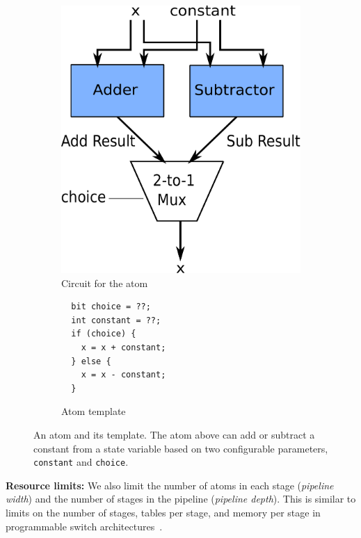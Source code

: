 \begin{figure}[h]
  \begin{subfigure}{0.4\columnwidth}
  \includegraphics[width=\textwidth]{circuit.pdf}
  \caption{Circuit for the atom}
  \label{fig:alu_diag}
  \end{subfigure}
  \hspace{0.05\columnwidth}
  \begin{subfigure}{0.55\columnwidth}
  \begin{lstlisting}
  bit choice = ??;
  int constant = ??;
  if (choice) {
    x = x + constant;
  } else {
    x = x - constant;
  }
  \end{lstlisting}
  \caption{Atom template}
  \label{fig:alu_in_sketch}
  \end{subfigure}
  \caption{An atom and its template. The atom above can add or subtract a constant from a state
  variable based on two configurable parameters, {\tt constant} and {\tt choice}.}
  \label{fig:atom}
\end{figure}

\textbf{Resource limits:} We also limit the number of atoms in each stage
(\textit{pipeline width}) and the number of stages in the pipeline
(\textit{pipeline depth}). This is similar to limits on the number of stages,
tables per stage, and memory per stage in programmable switch
architectures~\cite{lavanya_compiler}.

